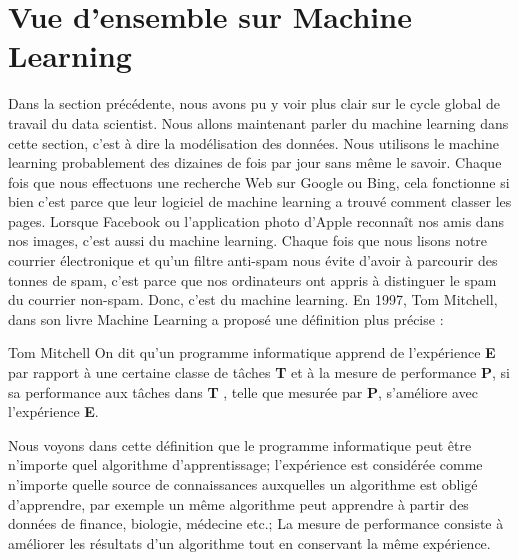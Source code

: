 \documentclass[12pt, french]{report}
\begin{document}
\section{Vue d'ensemble sur Machine Learning} \label{section:ml}

Dans la section précédente, nous avons pu y voir plus clair sur le cycle global de travail du data scientist. Nous allons maintenant parler du machine learning dans cette section, c'est à dire la modélisation des données. Nous utilisons le machine learning probablement des dizaines de fois par jour sans même le savoir. Chaque fois que nous effectuons une recherche Web sur Google ou Bing, cela fonctionne si bien c'est parce que leur logiciel de machine learning a trouvé comment classer les pages. Lorsque Facebook ou l'application photo d'Apple reconnaît nos amis dans nos images, c'est aussi du machine learning. Chaque fois que nous lisons notre courrier électronique et qu'un filtre anti-spam nous évite d'avoir à parcourir des tonnes de spam, c'est parce que nos ordinateurs ont appris à distinguer le spam du courrier non-spam. Donc, c'est du machine learning. En 1997, Tom Mitchell, dans son livre \guillemotleft Machine Learning \guillemotright a proposé une définition plus précise : 

\begin{pquotation} {Tom Mitchell \cite[p.~2]{key37}}
	\guillemotleft On dit qu'un programme informatique apprend de l'expérience \textbf{E} par rapport à une certaine classe de tâches \textbf{T} et à la mesure de performance \textbf{P}, si sa performance aux tâches dans \textbf{T} , telle que mesurée par \textbf{P}, s'améliore avec l'expérience \textbf{E}\guillemotright.
\end{pquotation} 

Nous voyons dans cette définition que le programme informatique peut être n'importe quel algorithme d'apprentissage; l'expérience est considérée comme n'importe quelle source de connaissances auxquelles un algorithme est obligé d'apprendre, par exemple un même algorithme peut apprendre à partir des données de finance, biologie, médecine etc.; La mesure de performance consiste à améliorer les résultats d'un algorithme tout en conservant la même expérience. \\ 
\end{document}
